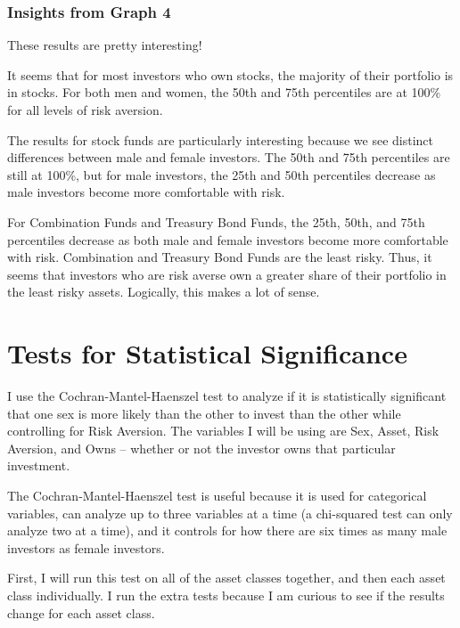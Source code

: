\documentclass[
]{article}
\begin{document}
\hypertarget{insights-from-graph-4}{%
\subsubsection{Insights from Graph 4}\label{insights-from-graph-4}}

These results are pretty interesting!

It seems that for most investors who own stocks, the majority of their
portfolio is in stocks. For both men and women, the 50th and 75th
percentiles are at 100\% for all levels of risk aversion.

The results for stock funds are particularly interesting because we see
distinct differences between male and female investors. The 50th and
75th percentiles are still at 100\%, but for male investors, the 25th
and 50th percentiles decrease as male investors become more comfortable
with risk.

For Combination Funds and Treasury Bond Funds, the 25th, 50th, and 75th
percentiles decrease as both male and female investors become more
comfortable with risk. Combination and Treasury Bond Funds are the least
risky. Thus, it seems that investors who are risk averse own a greater
share of their portfolio in the least risky assets. Logically, this
makes a lot of sense.

\hypertarget{tests-for-statistical-significance}{%
\section{Tests for Statistical
Significance}\label{tests-for-statistical-significance}}

I use the Cochran-Mantel-Haenszel test to analyze if it is statistically
significant that one sex is more likely than the other to invest than
the other while controlling for Risk Aversion. The variables I will be
using are Sex, Asset, Risk Aversion, and Owns -- whether or not the
investor owns that particular investment.

The Cochran-Mantel-Haenszel test is useful because it is used for
categorical variables, can analyze up to three variables at a time (a
chi-squared test can only analyze two at a time), and it controls for
how there are six times as many male investors as female investors.

First, I will run this test on all of the asset classes together, and
then each asset class individually. I run the extra tests because I am
curious to see if the results change for each asset class.
\end{document}
